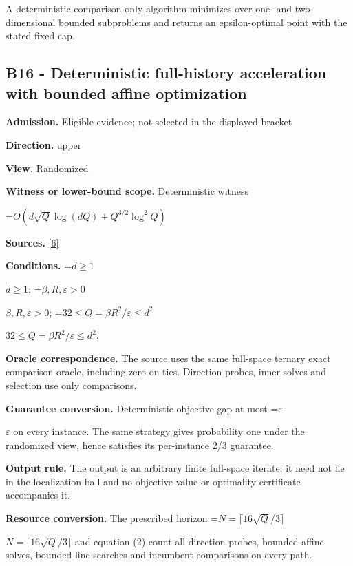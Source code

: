 \documentclass[10pt,a4paper]{article}
\newcommand{\AtlasMath}[1]{\par\begingroup\centering\setbox0=\hbox{$\displaystyle #1$}\ifdim\wd0>1.4\linewidth\typeout{ATLAS WIDE FORMULA: \the\wd0}\fi\ifdim\wd0>\linewidth\resizebox{\linewidth}{!}{\box0}\else\box0\fi\par\endgroup}
\newcommand{\AtlasInlineMath}[1]{\begingroup\setbox0=\hbox{$#1$}\ifdim\wd0>.4\linewidth\endgroup\AtlasMath{#1}\else\endgroup$#1$\fi}
\begin{document}
A deterministic comparison-only algorithm minimizes over one- and two-dimensional bounded subproblems and returns an epsilon-optimal point with the stated fixed cap.



\subsection{B16 - Deterministic full-history acceleration with bounded affine optimization}


\textbf{Admission.} Eligible evidence; not selected in the displayed bracket



\textbf{Direction.} upper



\textbf{View.} Randomized



\textbf{Witness or lower-bound scope.} Deterministic witness



\AtlasMath{O\!\left(d\sqrt Q\log(dQ)+Q^{3/2}\log^2 Q\right)}


\textbf{Sources.} \href{https://github.com/WU-Wendao/Colombo/blob/main/colombo_sensorium/Complexity_altas/data/sources/colombo/COLOMBO_KIMI_002/kimi_002.pdf}{[6]}



\textbf{Conditions.} \AtlasInlineMath{d\ge1}; \AtlasInlineMath{\beta,R,\varepsilon>0}; \AtlasInlineMath{32\le Q=\beta R^2/\varepsilon\le d^2}.



\textbf{Oracle correspondence.} The source uses the same full-space ternary exact comparison oracle, including zero on ties. Direction probes, inner solves and selection use only comparisons.



\textbf{Guarantee conversion.} Deterministic objective gap at most \AtlasInlineMath{\varepsilon} on every instance. The same strategy gives probability one under the randomized view, hence satisfies its per-instance 2/3 guarantee.



\textbf{Output rule.} The output is an arbitrary finite full-space iterate; it need not lie in the localization ball and no objective value or optimality certificate accompanies it.



\textbf{Resource conversion.} The prescribed horizon \AtlasInlineMath{N=\lceil16\sqrt Q/3\rceil} and equation (2) count all direction probes, bounded affine solves, bounded line searches and incumbent comparisons on every path.
\end{document}
